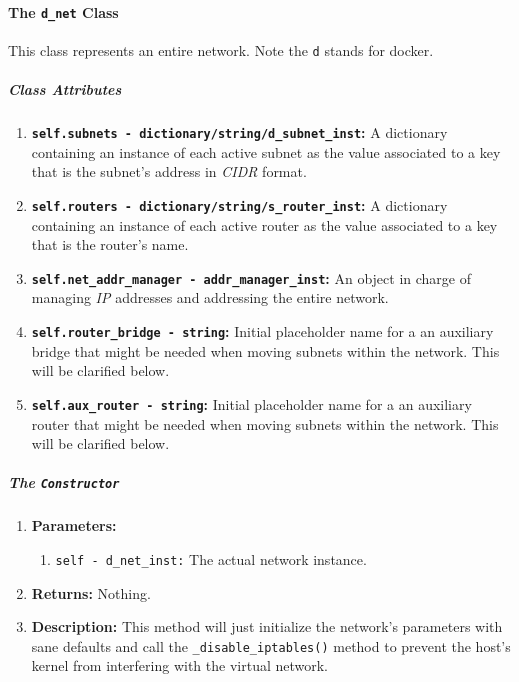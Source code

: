     \paragraph{The \texttt{d\_net} Class}
        This class represents an entire network. Note the \texttt{d} stands for docker.

        \subparagraph{Class Attributes}
            \begin{enumerate}
                \item \textbf{\texttt{self.subnets - dictionary/string/d\_subnet\_inst}:} A dictionary containing an instance of each active subnet as the value associated to a key that is the subnet's address in \textit{CIDR} format.
                \item \textbf{\texttt{self.routers - dictionary/string/s\_router\_inst}:} A dictionary containing an instance of each active router as the value associated to a key that is the router's name.
                \item \textbf{\texttt{self.net\_addr\_manager - addr\_manager\_inst}:} An object in charge of managing \textit{IP} addresses and addressing the entire network.
                \item \textbf{\texttt{self.router\_bridge - string}:} Initial placeholder name for a an auxiliary bridge that might be needed when moving subnets within the network. This will be clarified below.
                \item \textbf{\texttt{self.aux\_router - string}:} Initial placeholder name for a an auxiliary router that might be needed when moving subnets within the network. This will be clarified below.
            \end{enumerate}

        \subparagraph{The \texttt{Constructor}}
            \begin{enumerate}
                \item \textbf{Parameters:}
                \begin{enumerate}
                    \item \texttt{self - d\_net\_inst:} The actual network instance.
                \end{enumerate}
                \item \textbf{Returns:} Nothing.
                \item \textbf{Description:} This method will just initialize the network's parameters with sane defaults and call the \texttt{\_disable\_iptables()} method to prevent the host's kernel from interfering with the virtual network.
            \end{enumerate}

